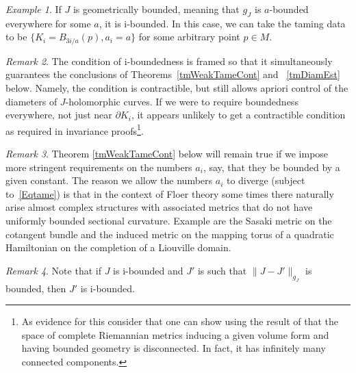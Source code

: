 \documentclass[11pt]{amsart}
\newcommand{\R}{\mathbb{R}}
\newcommand{\N}{\mathbb{N}}
\newtheorem{tm}{Theorem}[section]
\theoremstyle{definition}
\theoremstyle{remark}
\newtheorem{rem}[tm]{Remark}
\newtheorem{ex}[tm]{Example}
\begin{document}
\begin{ex}
If $J$ is geometrically bounded, meaning that $g_J$ is $a$-bounded everywhere for some $a$, it is i-bounded. In this case, we can take the taming data to be $\{K_i=B_{3i/a}(p),a_i=a\}$ for some arbitrary point $p\in M$.
\end{ex}

\begin{rem}\label{rmGeoBCont}
The condition of i-boundedness is framed so that it simultaneously guarantees the conclusions of Theorems~\ref{tmWeakTameCont} and ~\ref{tmDiamEst} below. Namely, the condition is contractible, but still allows apriori control of the diameters of $J$-holomorphic curves. If we were to require boundedness everywhere, not just near $\partial K_i$, it appears unlikely to get a contractible condition as required in invariance proofs\footnote{As evidence for this consider that one can show using the result of \cite{Nab96} that the space of complete Riemannian metrics inducing a given volume form and having bounded geometry is disconnected. In fact, it has infinitely many connected components.}.
\end{rem}
 \begin{rem}
 Theorem \ref{tmWeakTameCont} below will remain true if we impose more stringent requirements on the numbers $a_i$, say, that they be bounded by a given constant. The reason we allow the numbers $a_i$ to diverge (subject to~\eqref{Eqtame}) is that in the context of Floer theory some times there naturally arise almost complex structures with associated metrics that do not have uniformly bounded sectional curvature. Example are the Sasaki metric on the cotangent bundle and the induced metric on the mapping torus of a quadratic Hamiltonian on the completion of a Liouville domain.
\end{rem}

\begin{rem}
Note that  if $J$ is i-bounded and $J'$ is such that $\|J-J'\|_{g_J}$ is bounded, then $J'$ is i-bounded.
\end{rem}
\end{document}
